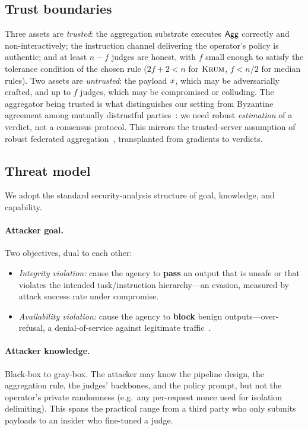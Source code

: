 \subsection{Trust boundaries}
Three assets are \emph{trusted}: the aggregation substrate executes $\mathsf{Agg}$ correctly and
non-interactively; the instruction channel delivering the operator's policy is authentic;
and at least $n-f$ judges are honest, with $f$ small enough to satisfy the tolerance
condition of the chosen rule ($2f{+}2<n$ for $\textsc{Krum}$, $f<n/2$ for median rules). Two
assets are \emph{untrusted}: the payload $x$, which may be adversarially crafted, and
up to $f$ judges, which may be compromised or colluding. The aggregator being trusted is
what distinguishes our setting from Byzantine agreement among mutually distrustful
parties~\cite{lamport1982byzantine,castro1999pbft}: we need robust \emph{estimation} of a
verdict, not a consensus protocol. This mirrors the trusted-server assumption of robust
federated aggregation~\cite{blanchard2017krum,yin2018byzantine}, transplanted from
gradients to verdicts.

\subsection{Threat model}
\label{sec:threatmodel}
We adopt the standard security-analysis structure of goal, knowledge, and capability.

\paragraph{Attacker goal.}
Two objectives, dual to each other:
\begin{itemize}[leftmargin=1.4em,itemsep=1pt,topsep=2pt]
  \item \emph{Integrity violation:} cause the agency to \textbf{pass} an output that is
        unsafe or that violates the intended task/instruction
        hierarchy—an evasion, measured by attack success rate under compromise.
  \item \emph{Availability violation:} cause the agency to \textbf{block} benign
        outputs—over-refusal, a denial-of-service against legitimate
        traffic~\cite{zhou2025corba}.
\end{itemize}

\paragraph{Attacker knowledge.}
Black-box to gray-box. The attacker may know the pipeline design, the aggregation rule,
the judges' backbones, and the policy prompt, but not the operator's private randomness
(e.g.\ any per-request nonce used for isolation delimiting). This spans the practical
range from a third party who only submits payloads to an insider who fine-tuned a judge.


